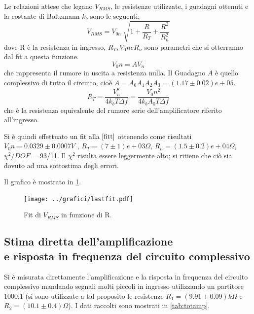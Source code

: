 \documentclass[a4paper,10pt]{article}
\begin{document}
\vspace*{-5pt}
Le relazioni attese che legano $V_{RMS}$, le resistenze utilizzate, i guadagni ottenuti e la costante di Boltzmann $k_b$ sono le seguenti:
\vspace*{-8pt}
\begin{equation}
V_{RMS} = V_{0n} \sqrt[]{1+\frac{R}{R_T}+\frac{R^2}{R_n ^2}}
\label{fitt}
\end{equation}
dove R è la resistenza in ingresso, $R_T, V_0n e R_n$ sono parametri che si otterranno dal fit a questa funzione.
\begin{equation}
V_0n = A V_n
\label{resnull}
\end{equation}
che rappresenta il rumore in uscita a resistenza nulla. Il Guadagno $A$ è quello complessivo di tutto il circuito, cioè $A = A_0 A_1 A_2 A_3 = (1.17\pm0.02)e+05 $.
\vspace*{-10pt}
\begin{equation}
R_T = \frac{V_n^2}{4k_b T \Delta f} = \frac{V_0n^2}{4k_b A_0 T \Delta f}
\label{kb}
\end{equation}
che è la resistenza equivalente del rumore serie dell'amplificatore riferito all'ingresso.

Si è quindi effettuato un fit alla $\eqref{fitt}$ ottenendo come risultati $V_0n = 0.0329\pm0.0007 V$ , $R_T = (7\pm1)e+03 \Omega $, $R_n = (1.5\pm 0.2)e+04 \Omega$, $\chi ^2 /DOF$ = 93/11. Il $\chi ^2$ risulta essere leggermente alto; si ritiene che ciò sia dovuto ad una sottostima degli errori.

Il grafico è mostrato in \cref{fig:lastfit}.
\vspace*{-10pt}
\begin{figure}[H]
	\centering
	\texttt{[image: ../grafici/lastfit.pdf]}
	\vspace*{-15pt}
	\caption{Fit di $V_{RMS}$ in funzione di R.}
	\label{fig:lastfit}
\end{figure}



\subsection{Stima diretta dell'amplificazione \\e risposta in frequenza del circuito complessivo}
Si è misurata direttamente l'amplificazione e la risposta in frequenza del circuito complessivo mandando segnali molti piccoli in ingresso utilizzando un partitore 1000:1 (si sono utilizzate a tal proposito le resistenze $R_1 = (9.91\pm0.09) k\Omega $ e $R_2 = (10.1\pm0.4) \Omega$).
I dati raccolti sono mostrati in \cref{tab:totamp}.
\end{document}
